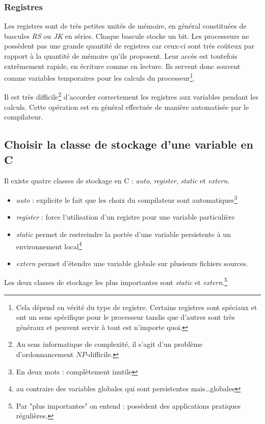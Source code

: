 \documentclass[../../../main.tex]{subfiles}
\begin{document}
\subsubsection{Registres}
\label{ssub:registres}
Les registres sont de très petites unités de mémoire, en général constituées de bascules \textit{RS} ou \textit{JK} en séries. Chaque bascule stocke un bit. Les processeurs ne possèdent pas une grande quantité de registres car ceux-ci sont très coûteux par rapport à la quantité de mémoire qu'ils proposent. Leur accès est toutefois extrêmement rapide, en écriture comme en lecture. Ils servent donc souvent comme variables temporaires pour les calculs du processeur\footnote{Cela dépend en vérité du type de registre. Certains registres sont spéciaux et ont un sens spécifique pour le processeur tandis que d'autres sont très généraux et peuvent servir à tout est n'importe quoi.}.

Il est très difficile\footnote{Au sens informatique de complexité, il s'agit d'un problème d'ordonnancement $NP$-difficile.} d'accorder correctement les registres aux variables pendant les calculs. Cette opération est en général effectuée de manière automatisée par le compilateur.
\subsection{Choisir la classe de stockage d'une variable en C}
\label{sub:choisir_la_classe_de_stockage_d_une_variable_en_c}
Il existe quatre classes de stockage en C : \textit{auto}, \textit{register}, \textit{static} et \textit{extern}.
\begin{itemize}
	\item \textit{auto} : explicite le fait que les choix du compilateur sont automatiques\footnote{En deux mots : complètement inutile}
	\item \textit{register} : force l'utilisation d'un registre pour une variable particulière
	\item \textit{static} permet de restreindre la portée d'une variable persistente à un environnement local\footnote{au contraire des variables globales qui sont persistentes mais\dots globales}
	\item \textit{extern} permet d'étendre une variable globale sur plusieurs fichiers sources.
\end{itemize}
Les deux classes de stockage les plus importantes sont \textit{static} et \textit{extern}.\footnote{Par "plus importantes" on entend : possèdent des applications pratiques régulières.}
\end{document}

